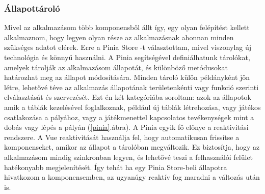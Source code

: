 \documentclass[a4paper,twoside]{article}
\begin{document}
\subsubsection{Állapottároló}
Mivel az alkalmazásom több komponensből állt így, egy olyan felépítést kellett alkalmaznom, hogy legyen olyan része 
az alkalmazásnak ahonnan minden szükséges adatot elérek. Erre a Pinia Store \cite{pinia}-t választottam, mivel viszonylag új technológia és könnyű használni. 
A Pinia segítségével definiálhatunk tárolókat, amelyek tárolják az alkalmazásom állapotát,
és különböző metódusokat határozhat meg az állapot módosítására. Minden tároló külön
példányként jön létre, lehetővé téve az alkalmazás állapotának területenkénti vagy funkció
szerinti elválasztását és \mbox{szervezését}. Ezt én két kategóriába soroltam: azok az állapotok amik a táblák kezelésével foglalkoznak, például új táblák
létrehozása, vagy játékos csatlakozása a pályához, vagy a játékmenettel kapcsolatos tevékenységek mint a dobás vagy lépés a pályán (\ref{pinia}.ábra). 
A Pinia egyik fő előnye a reaktivitási rendszere. A Vue reaktivitását használja fel, hogy
automatikusan frissítse a komponenseket, amikor az állapot a tárolóban megváltozik. Ez
biztosítja, hogy az alkalmazásom mindig szinkronban legyen, és lehetővé teszi a
felhasználói felület hatékonyabb megjelenítését. Így tehát ha egy Pinia Store-beli állapotra hivatkozom a komponensemben, az ugyanúgy reaktív fog maradni a változás után is. 
\end{document}
